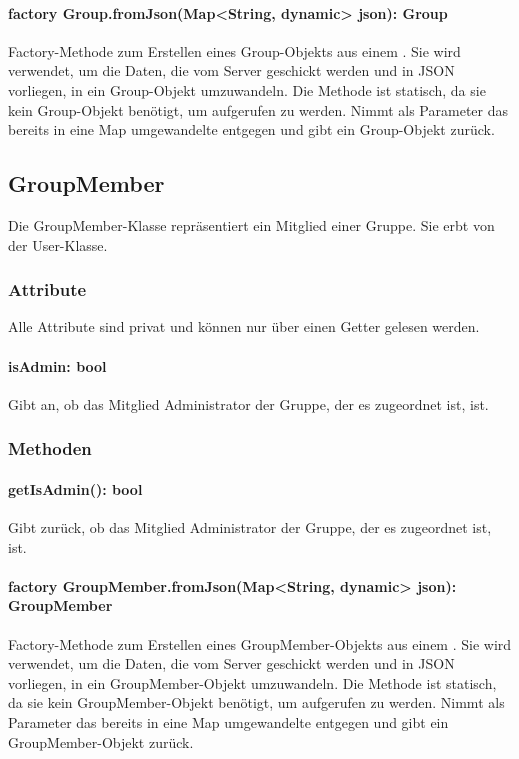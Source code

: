\documentclass[parskip=full]{scrartcl}
\begin{document}
\paragraph{factory Group.fromJson(Map<String, dynamic> json): Group} Factory-Methode zum Erstellen eines Group-Objekts aus einem . Sie wird verwendet, um die Daten, die vom Server geschickt werden und in \Gls{JSON} vorliegen, in ein Group-Objekt umzuwandeln. Die Methode ist statisch, da sie kein Group-Objekt benötigt, um aufgerufen zu werden. Nimmt als Parameter das bereits in eine Map umgewandelte  entgegen und gibt ein Group-Objekt zurück.

\subsection{GroupMember}
Die GroupMember-Klasse repräsentiert ein Mitglied einer Gruppe. Sie erbt von der User-Klasse.
\subsubsection{Attribute}
Alle Attribute sind privat und können nur über einen Getter gelesen werden.
\paragraph{isAdmin: bool}
Gibt an, ob das Mitglied Administrator der Gruppe, der es zugeordnet ist, ist.
\subsubsection{Methoden}
\paragraph{getIsAdmin(): bool}
Gibt zurück, ob das Mitglied Administrator der Gruppe, der es zugeordnet ist, ist.
\paragraph{factory GroupMember.fromJson(Map<String, dynamic> json): GroupMember} Factory-Methode zum Erstellen eines GroupMember-Objekts aus einem . Sie wird verwendet, um die Daten, die vom Server geschickt werden und in \Gls{JSON} vorliegen, in ein GroupMember-Objekt umzuwandeln. Die Methode ist statisch, da sie kein GroupMember-Objekt benötigt, um aufgerufen zu werden. Nimmt als Parameter das bereits in eine Map umgewandelte  entgegen und gibt ein GroupMember-Objekt zurück.
\end{document}
